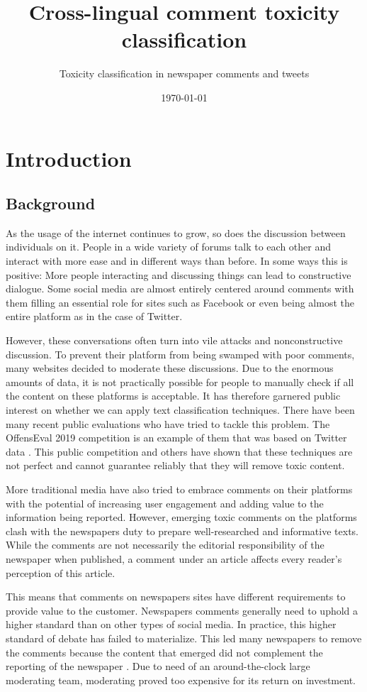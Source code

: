 \documentclass[nofilelist]{cslthse-msc}
\title{Cross-lingual comment toxicity classification}
\subtitle{Toxicity classification in newspaper comments and tweets}
\date{\today}
\begin{document}
\renewcommand{\bibname}{References}

\makefrontmatter
\chapter[Introduction]{Introduction}
\section{Background}
As the usage of the internet continues to grow, so does the discussion between individuals on it. People in a wide variety of forums talk to each other and interact with more ease and in different ways than before. In some ways this is positive: More people interacting and discussing things can lead to constructive dialogue. Some social media are almost entirely centered around comments with them filling an essential role for sites such as Facebook or even being almost the entire platform as in the case of Twitter. 

However, these conversations often turn into vile attacks and nonconstructive discussion. To prevent their platform from being swamped with poor comments, many websites decided to moderate these discussions. Due to the enormous amounts of data, it is not practically possible for people to manually check if all the content on these platforms is acceptable. It has therefore garnered public interest on whether we can apply text classification techniques. There have been many recent public evaluations who have tried to tackle this problem. The OffensEval 2019 competition is an example of them that was based on Twitter data \citep{zampieri2019semeval}. This public competition and others have shown that these techniques are not perfect and cannot guarantee reliably that they will remove toxic content.

More traditional media have also tried to embrace comments on their platforms with the potential of increasing user engagement and adding value to the information being reported. However, emerging toxic comments on the platforms clash with the newspapers duty to prepare well-researched and informative texts. While the comments are not necessarily the editorial responsibility of the newspaper when published, a comment under an article  affects every reader's perception of this article. 

This means that comments on newspapers sites have different requirements to provide value to the customer. Newspapers comments  generally need to uphold a higher standard than on other types of social media. In practice, this higher standard of debate has failed to materialize. This led many newspapers to remove the comments because the content that emerged did not complement the reporting of the newspaper \citep{trygg2012comment}. Due to need of an around-the-clock large moderating team, moderating proved too expensive for its return on investment.
\end{document}
